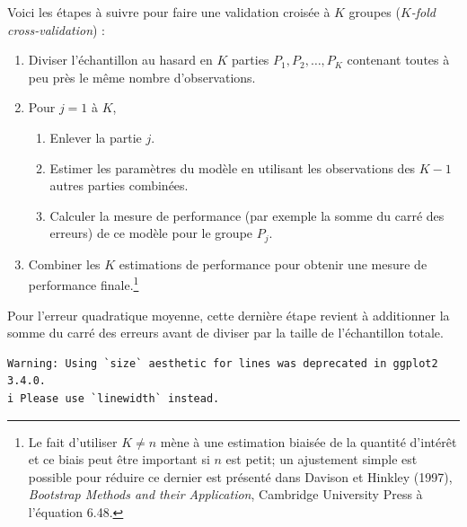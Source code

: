 \documentclass[
  11pt,
  letterpaper,
]{scrbook}
\providecommand{\tightlist}{%
  \setlength{\itemsep}{0pt}\setlength{\parskip}{0pt}}\usepackage{longtable,booktabs,array}
\theoremstyle{definition}
\theoremstyle{remark}
\begin{document}
Voici les étapes à suivre pour faire une validation croisée à \(K\)
groupes (\emph{\(K\)-fold cross-validation}) :

\begin{enumerate}
\def\labelenumi{\arabic{enumi}.}
\tightlist
\item
  Diviser l'échantillon au hasard en \(K\) parties
  \(P_1, P_2, \ldots, P_K\) contenant toutes à peu près le même nombre
  d'observations.
\item
  Pour \(j = 1\) à \(K\),

  \begin{enumerate}
  \def\labelenumii{\roman{enumii}.}
  \tightlist
  \item
    Enlever la partie \(j\).
  \item
    Estimer les paramètres du modèle en utilisant les observations des
    \(K-1\) autres parties combinées.
  \item
    Calculer la mesure de performance (par exemple la somme du carré des
    erreurs) de ce modèle pour le groupe \(P_j\).
  \end{enumerate}
\item
  Combiner les \(K\) estimations de performance pour obtenir une mesure
  de performance finale.\footnote{Le fait d'utiliser \(K \neq n\) mène à
    une estimation biaisée de la quantité d'intérêt et ce biais peut
    être important si \(n\) est petit; un ajustement simple est possible
    pour réduire ce dernier est présenté dans Davison et Hinkley (1997),
    \emph{Bootstrap Methods and their Application}, Cambridge University
    Press à l'équation 6.48.}
\end{enumerate}

Pour l'erreur quadratique moyenne, cette dernière étape revient à
additionner la somme du carré des erreurs avant de diviser par la taille
de l'échantillon totale.

\begin{verbatim}
Warning: Using `size` aesthetic for lines was deprecated in ggplot2 3.4.0.
i Please use `linewidth` instead.
\end{verbatim}
\end{document}
